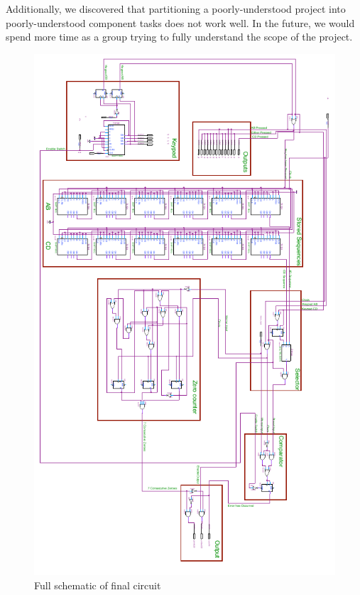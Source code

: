 \documentclass[11pt,letterpaper,titlepage]{article}
\begin{document}
Additionally, we discovered that partitioning a poorly-understood project into poorly-understood component tasks does not work well. In the future, we would spend more time as a group trying to fully understand the scope of the project.
\newpage
\begin{figure}
	\vspace{-0.7in}

	\begin{center}
		\includegraphics[width=4.6in]{graphics/schematic.pdf}
		\caption{Full schematic of final circuit}
		\label{fig:schematic}
	\end{center}
\end{figure}
\end{document}
